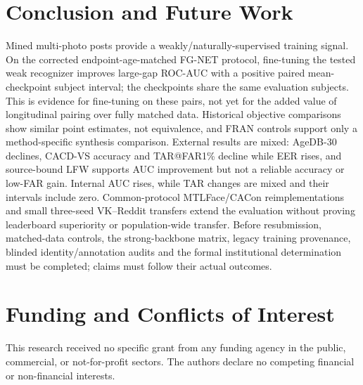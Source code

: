\documentclass[journal]{IEEEtran}
\begin{document}
\section{Conclusion and Future Work}\label{sec:conclusion}
Mined multi-photo posts provide a weakly/naturally-supervised training signal. On the corrected
endpoint-age-matched FG-NET protocol, fine-tuning the tested weak recognizer improves large-gap
ROC-AUC with a positive paired mean-checkpoint subject interval; the checkpoints share the same evaluation
subjects. This is evidence for fine-tuning on these pairs, not yet for the added value of longitudinal
pairing over fully matched data. Historical objective comparisons show similar point estimates,
not equivalence, and FRAN controls support only a method-specific synthesis comparison.
External results are mixed: AgeDB-30 declines, CACD-VS accuracy and TAR@FAR1\% decline while EER rises, and source-bound LFW
supports AUC improvement but not a reliable accuracy or low-FAR gain.
Internal AUC rises, while TAR changes are mixed and their intervals include zero.
Common-protocol MTLFace/CACon reimplementations and
small three-seed VK--Reddit transfers extend the evaluation without proving leaderboard superiority
or population-wide transfer. Before resubmission, matched-data controls, the strong-backbone matrix,
legacy training provenance, blinded identity/annotation audits and the formal institutional
determination must be completed; claims must follow their actual outcomes.

\section*{Funding and Conflicts of Interest}
This research received no specific grant from any funding agency in the public, commercial, or not-for-profit sectors. The authors declare no competing financial or non-financial interests.



\end{document}
